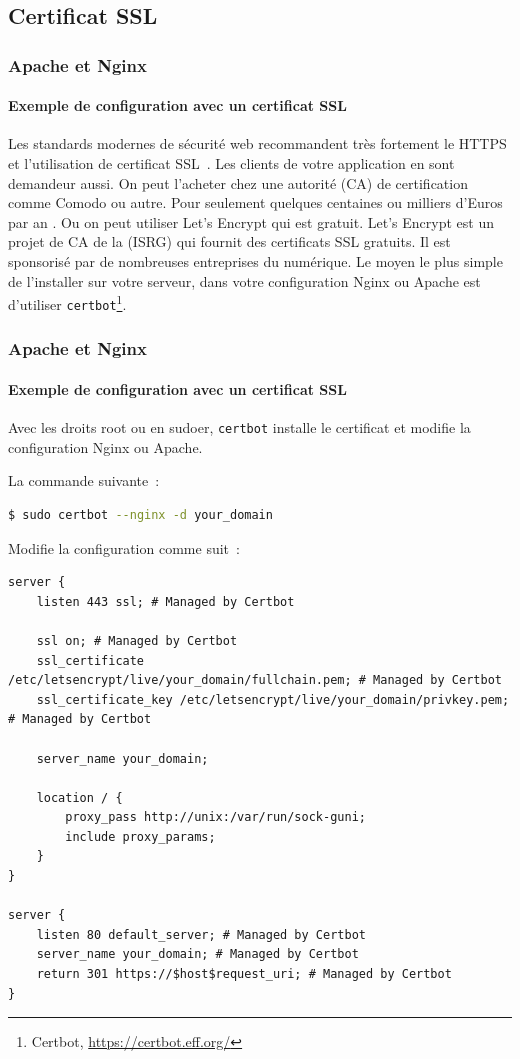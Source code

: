 \documentclass{beamer}
\begin{document}
    \subsection{Certificat SSL}\label{subsec:certificat-ssl}
    \begin{frame}
        \transdissolve
        \frametitle{Apache et Nginx}
        \framesubtitle{Exemple de configuration avec un certificat SSL}
        Les standards modernes de sécurité web recommandent très fortement le HTTPS et l'utilisation de certificat SSL~.
        Les clients de votre application en sont demandeur aussi.
        \bigbreak
        On peut l'acheter chez une autorité (CA) de certification comme Comodo ou autre.
        Pour seulement quelques centaines ou milliers d'Euros par an .
        Ou on peut utiliser Let's Encrypt qui est gratuit.
        \bigbreak
        Let's Encrypt est un projet de CA de la  (ISRG) qui fournit des certificats SSL gratuits.
        Il est sponsorisé par de nombreuses entreprises du numérique.
        \bigbreak
        Le moyen le plus simple de l'installer sur votre serveur, dans votre configuration Nginx ou Apache est d'utiliser \lstinline{certbot}\footnote{Certbot, \url{https://certbot.eff.org/}}.
    \end{frame}

    \begin{frame}[fragile]
        \transdissolve
        \frametitle{Apache et Nginx}
        \framesubtitle{Exemple de configuration avec un certificat SSL}
        Avec les droits root ou en sudoer, \lstinline{certbot} installe le certificat et modifie la configuration Nginx ou Apache.

        La commande suivante~:
        \begin{lstlisting}[language=bash,basicstyle=\ttfamily\tiny]
$ sudo certbot --nginx -d your_domain
        \end{lstlisting}
        Modifie la configuration comme suit~:
        \begin{lstlisting}[basicstyle=\ttfamily\tiny]
server {
    listen 443 ssl; # Managed by Certbot

    ssl on; # Managed by Certbot
    ssl_certificate     /etc/letsencrypt/live/your_domain/fullchain.pem; # Managed by Certbot
    ssl_certificate_key /etc/letsencrypt/live/your_domain/privkey.pem; # Managed by Certbot

    server_name your_domain;

    location / {
        proxy_pass http://unix:/var/run/sock-guni;
        include proxy_params;
    }
}

server {
    listen 80 default_server; # Managed by Certbot
    server_name your_domain; # Managed by Certbot
    return 301 https://$host$request_uri; # Managed by Certbot
}
        \end{lstlisting}
    \end{frame}
\end{document}
